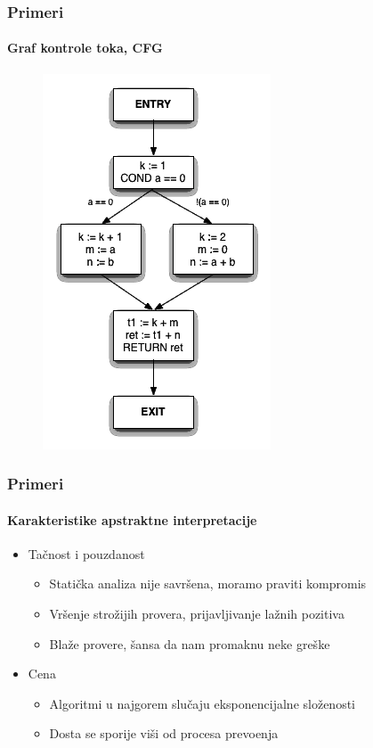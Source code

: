 \documentclass[xetex,mathserif,serif]{beamer}
\begin{document}
  \begin{frame}
    \frametitle{Primeri}
    \framesubtitle{Graf kontrole toka, CFG}
    \begin{figure}
		\begin{center}
		\includegraphics[scale=0.5]{Treehydra-cfg.png}
		\end{center}
	\end{figure}
  \end{frame}
  \begin{frame}
    \frametitle{Primeri}
    \framesubtitle{Karakteristike apstraktne interpretacije}
	\begin{center}
		\begin{itemize}
			\item Ta\v cnost i pouzdanost
				\begin{itemize}
					\item Stati\v cka analiza nije savr\v sena, moramo praviti kompromis
					\item Vr\v senje stro\v zijih provera, prijavljivanje la\v znih pozitiva
					\item Bla\v ze provere, \v sansa da nam promaknu neke gre\v ske
				\end{itemize}
			\item Cena
				\begin{itemize}
					\item Algoritmi u najgorem slu\v caju eksponencijalne slo\v zenosti
					\item Dosta se sporije vi\v si od procesa prevo\dj{}enja
				\end{itemize}
		\end{itemize}
	\end{center}
  \end{frame}
  
\end{document}
